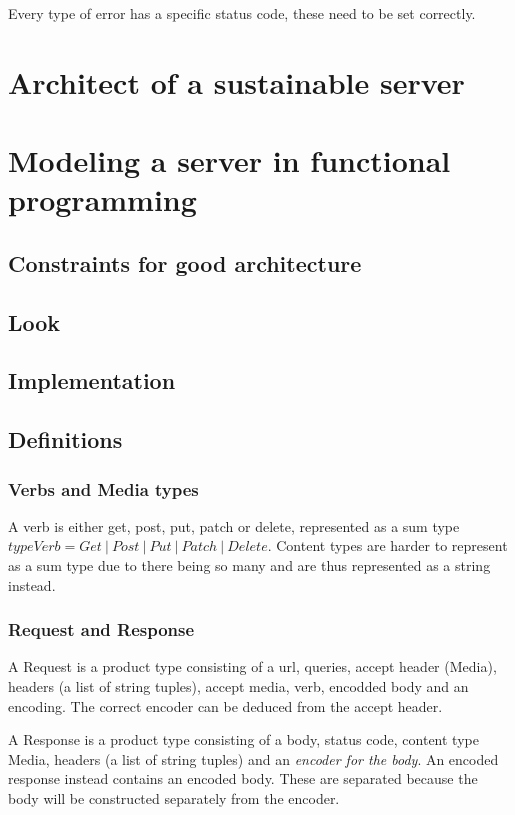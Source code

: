 Every type of error has a specific status code, these need to be set correctly.

\section{Architect of a sustainable server} 

\section{Modeling a server in functional programming}

\subsection{Constraints for good architecture}

\subsection{Look}

\subsection{Implementation}

\subsection{Definitions}

\subsubsection{Verbs and Media types}

A verb is either get, post, put, patch or delete, represented as a sum type $type Verb = Get\ |\ Post\ |\ Put\ |\ Patch\ |\
Delete$. Content types are harder to represent as a sum type due to there being
so many and are thus represented as a string instead.

\subsubsection{Request and Response}

A Request is a product type consisting of a url, queries, accept header (Media),
headers (a list of string tuples), accept media, verb, encodded body and an
encoding. The correct encoder can be deduced from the accept header.

A Response is a product type consisting of a body, status code, content type
Media, headers (a list of string tuples) and an \textit{encoder for the body}.
An encoded response instead contains an encoded body. These are separated
because the body will be constructed separately from the encoder.

